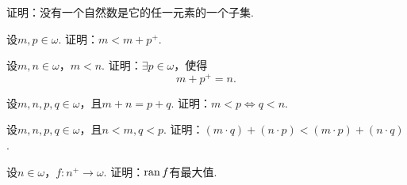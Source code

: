 \begin{example}
证明：没有一个自然数是它的任一元素的一个子集.
\end{example}

\begin{example}
设\(m,p\in\omega\).
证明：\(m<m+p^+\).
\end{example}

\begin{example}
设\(m,n\in\omega\)，\(m<n\).
证明：\(\exists p\in\omega\)，使得\[
	m+p^+=n.
\]
\end{example}

\begin{example}
设\(m,n,p,q\in\omega\)，且\(m+n=p+q\).
证明：\(m<p \iff q<n\).
\end{example}

\begin{example}
设\(m,n,p,q\in\omega\)，且\(n<m,q<p\).
证明：\((m \cdot q)+(n \cdot p)<(m \cdot p)+(n \cdot q)\).
\end{example}

\begin{example}
设\(n\in\omega\)，\(f\colon n^+\to\omega\).
证明：\(\operatorname{ran} f\)有最大值.
\end{example}
